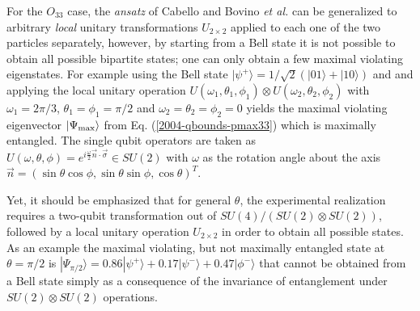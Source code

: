 \documentclass[prl,showpacs,showkeys,amsfonts,amsmath,twocolumn]{revtex4}
\newcommand{\ket}[1]{|#1\rangle}
\begin{document}
For the $O_{33}$ case,
the {\it ansatz} of Cabello \cite{cabello-2003a} and Bovino \emph{et al.} \cite{bovino-2003}
can be generalized to arbitrary {\em local}
unitary transformations $U_{2\times 2}$ applied to each one of the two particles
separately, however, by starting from a Bell state it is not possible to obtain all possible
bipartite states; one
can only obtain a few maximal violating eigenstates. For example using the Bell state
$\ket{\psi^+} = 1/\sqrt{2}(\ket{01} + \ket{10})$ and
and applying the local unitary operation $U(\omega_1,\theta_1,\phi_1)\otimes
U(\omega_2,\theta_2,\phi_2)$ with $\omega_1 =2\pi/3$,
$\theta_1=\phi_1=\pi/2$ and $\omega_2=\theta_2=\phi_2=0$ yields the  maximal violating eigenvector
$\ket{\Psi_{\rm max}}$ from
Eq. (\ref{2004-qbounds-pmax33}) which is maximally entangled. The single
qubit operators are taken as $U(\omega,\theta,\phi) =
e^{i\frac{\omega}{2} \vec{n}\cdot\vec{\sigma}} \in SU(2)$ with
$\omega$ as the rotation angle about the axis $\vec{n}=
(\sin\theta\cos\phi,\sin\theta\sin\phi,\cos\theta)^T$.

Yet, it should be emphasized that for
general $\theta$, the experimental realization requires a two-qubit
transformation out of
$SU(4)/(SU(2)\otimes SU(2))$, followed by a local
unitary operation $U_{2\times 2}$ in order to obtain all possible states.
As an example the maximal violating, but not maximally entangled state at $\theta=\pi/2$ is
$\ket{\Psi_{\pi/2}} = 0.86
  \ket{\psi^+} + 0.17\ket{\psi^-} + 0.47\ket{\phi^-}$ that cannot be
  obtained from a Bell state simply as a consequence of the invariance of
  entanglement under $SU(2) \otimes SU(2)$ operations.
\end{document}
